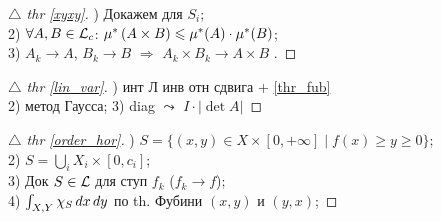
\begin{minipage}[t]{0.45\textwidth}

\begin{proof}[
{$\triangle$} 
thr \eqref{xyxy}]

\phantom{42}

) Докажем для $S_i$; \\
2) $\forall A, B \in \mathcal{L}_c$: $\mu^*\left(A \times B\right) \leqslant \mu^*(A) \cdot \mu^*(B)$; \\
3) $A_k \to A$, $B_k \to B$ $\Rightarrow$ $A_k \times B_k \to A \times B$ .
\end{proof}

\begin{proof}[
{$\triangle$} 
thr \eqref{lin_var}]

\phantom{42}

) инт Л инв отн сдвига + \eqref{thr_fub} \\
2) метод Гаусса;
3) diag $\leadsto$ $I \cdot |\det A|$
\end{proof}

\end{minipage}
\hfill
\begin{minipage}[t]{0.45\textwidth}
\begin{proof}[
{$\triangle$} 
thr \eqref{order_hor}]

\phantom{42}

) $S = \{(x,y) \in X \times [0, +\infty] \mid f(x) \geq y \geq 0\}$;\\
2) $S = \bigcup_i X_i \times [0, c_i]$;\\
3) Док $S \in \mathcal{L}$ для ступ $f_k$ ($f_k \to f$); \\
4) $\int_{X,Y}\chi_S \, d x \, d y$ по th. Фубини $(x,y)$ и $(y,x)$;
\end{proof}
\end{minipage}  